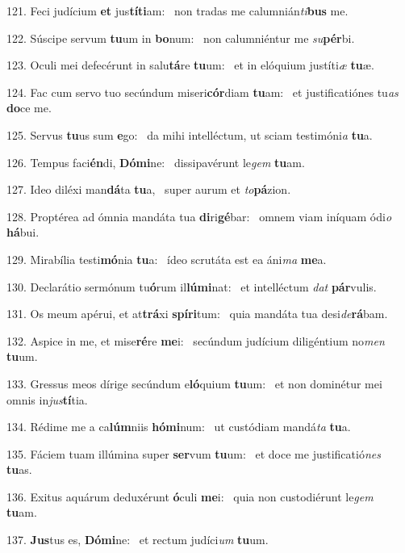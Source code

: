 121. Feci judícium \textbf{et} jus\textbf{tí}\textbf{ti}am: \ast\  non tradas me calumnián\textit{ti}\textbf{bus} me.\

122. Súscipe servum \textbf{tu}um in \textbf{bo}num: \ast\  non calumniéntur me \textit{su}\textbf{pér}bi.\

123. Oculi mei defecérunt in salu\textbf{tá}re \textbf{tu}um: \ast\  et in elóquium justíti\textit{æ} \textbf{tu}æ.\

124. Fac cum servo tuo secúndum miseri\textbf{cór}diam \textbf{tu}am: \ast\  et justificatiónes tu\textit{as} \textbf{do}ce me.\

125. Servus \textbf{tu}us sum \textbf{e}go: \ast\  da mihi intelléctum, ut sciam testimóni\textit{a} \textbf{tu}a.\

126. Tempus faci\textbf{én}di, \textbf{Dó}\textbf{mi}ne: \ast\  dissipavérunt le\textit{gem} \textbf{tu}am.\

127. Ideo diléxi man\textbf{dá}ta \textbf{tu}a, \ast\  super aurum et \textit{to}\textbf{pá}zion.\

128. Proptérea ad ómnia mandáta tua \textbf{di}ri\textbf{gé}bar: \ast\  omnem viam iníquam ódi\textit{o} \textbf{há}bui.\

129. Mirabília testi\textbf{mó}nia \textbf{tu}a: \ast\  ídeo scrutáta est ea áni\textit{ma} \textbf{me}a.\

130. Declarátio sermónum tu\textbf{ó}rum il\textbf{lú}\textbf{mi}nat: \ast\  et intelléctum \textit{dat} \textbf{pár}vulis.\

131. Os meum apérui, et at\textbf{trá}xi \textbf{spí}\textbf{ri}tum: \ast\  quia mandáta tua desi\textit{de}\textbf{rá}bam.\

132. Aspice in me, et mise\textbf{ré}re \textbf{me}i: \ast\  secúndum judícium diligéntium no\textit{men} \textbf{tu}um.\

133. Gressus meos dírige secúndum e\textbf{ló}quium \textbf{tu}um: \ast\  et non dominétur mei omnis in\textit{jus}\textbf{tí}tia.\

134. Rédime me a ca\textbf{lúm}niis \textbf{hó}\textbf{mi}num: \ast\  ut custódiam mandá\textit{ta} \textbf{tu}a.\

135. Fáciem tuam illúmina super \textbf{ser}vum \textbf{tu}um: \ast\  et doce me justificatió\textit{nes} \textbf{tu}as.\

136. Exitus aquárum deduxérunt \textbf{ó}culi \textbf{me}i: \ast\  quia non custodiérunt le\textit{gem} \textbf{tu}am.\

137. \textbf{Jus}tus es, \textbf{Dó}\textbf{mi}ne: \ast\  et rectum judíci\textit{um} \textbf{tu}um.\

